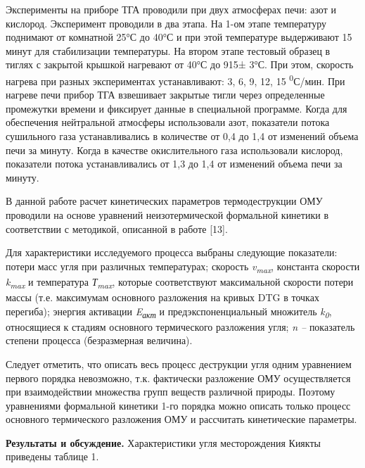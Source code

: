 \begin{multicols}{2}
Эксперименты на приборе ТГА проводили при двух атмосферах печи: азот и
кислород. Эксперимент проводили в два этапа. На 1-ом этапе температуру
поднимают от комнатной 25°С до 40°С и при этой температуре выдерживают
15 минут для стабилизации температуры. На втором этапе тестовый образец
в тиглях с закрытой крышкой нагревают от 40°С до 915± 3°С. При этом,
скорость нагрева при разных экспериментах устанавливают: 3, 6, 9, 12, 15
\textsuperscript{0}С/мин. При нагреве печи прибор ТГА взвешивает
закрытые тигли через определенные промежутки времени и фиксирует данные
в специальной программе. Когда для обеспечения нейтральной атмосферы
использовали азот, показатели потока сушильного газа устанавливались в
количестве от 0,4 до 1,4 от изменений объема печи за минуту. Когда в
качестве окислительного газа использовали кислород, показатели потока
устанавливались от 1,3 до 1,4 от изменений объема печи за минуту.

В данной работе расчет кинетических параметров термодеструкции ОМУ
проводили на основе уравнений неизотермической формальной кинетики в
соответствии с методикой, описанной в работе {[}13{]}.

Для характеристики исследуемого процесса выбраны следующие показатели:
потери масс угля при различных температурах; скорость
\emph{v\textsubscript{max}}, константа скорости
\emph{k\textsubscript{max}} и температура \emph{Т\textsubscript{max}},
которые соответствуют максимальной скорости потери массы (т.е.
максимумам основного разложения на кривых DTG в точках перегиба);
энергия активации \emph{E\textsubscript{акт }}и предэкспоненциальный
множитель \emph{k\textsubscript{0}}, относящиеся к стадиям основного
термического разложения угля; \emph{n --} показатель степени процесса
(безразмерная величина).

Следует отметить, что описать весь процесс деструкции угля одним
уравнением первого порядка невозможно, т.к. фактически разложение ОМУ
осуществляется при взаимодействии множества групп веществ различной
природы. Поэтому уравнениями формальной кинетики 1-го порядка можно
описать только процесс основного термического разложения ОМУ и
рассчитать кинетические параметры.

{\bfseries Результаты и обсуждение.} Характеристики угля месторождения
Киякты приведены таблице 1.
\end{multicols}

